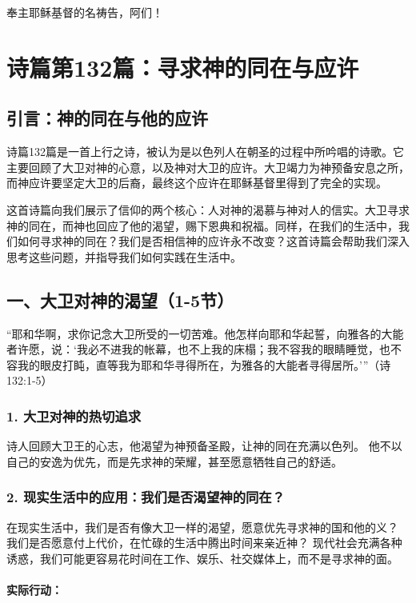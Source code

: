 \documentclass[a4paper, 12pt]{article}
\begin{document}
奉主耶稣基督的名祷告，阿们！
\newpage
\section{诗篇第132篇：寻求神的同在与应许}


\subsection*{引言：神的同在与他的应许}
\hspace{0.6cm}诗篇132篇是一首上行之诗，被认为是以色列人在朝圣的过程中所吟唱的诗歌。它主要回顾了大卫对神的心意，以及神对大卫的应许。大卫竭力为神预备安息之所，而神应许要坚定大卫的后裔，最终这个应许在耶稣基督里得到了完全的实现。

这首诗篇向我们展示了信仰的两个核心：人对神的渴慕与神对人的信实。大卫寻求神的同在，而神也回应了他的渴望，赐下恩典和祝福。同样，在我们的生活中，我们如何寻求神的同在？我们是否相信神的应许永不改变？这首诗篇会帮助我们深入思考这些问题，并指导我们如何实践在生活中。

\subsection*{一、大卫对神的渴望（1-5节）}
“耶和华啊，求你记念大卫所受的一切苦难。他怎样向耶和华起誓，向雅各的大能者许愿，说：‘我必不进我的帐幕，也不上我的床榻；我不容我的眼睛睡觉，也不容我的眼皮打盹，直等我为耶和华寻得所在，为雅各的大能者寻得居所。’”（诗132:1-5）

\subsubsection*{1. 大卫对神的热切追求}
诗人回顾大卫王的心志，他渴望为神预备圣殿，让神的同在充满以色列。
他不以自己的安逸为优先，而是先求神的荣耀，甚至愿意牺牲自己的舒适。
\subsubsection*{2. 现实生活中的应用：我们是否渴望神的同在？}
在现实生活中，我们是否有像大卫一样的渴望，愿意优先寻求神的国和他的义？
我们是否愿意付上代价，在忙碌的生活中腾出时间来亲近神？
现代社会充满各种诱惑，我们可能更容易花时间在工作、娱乐、社交媒体上，而不是寻求神的面。
\paragraph*{实际行动：}
\end{document}
